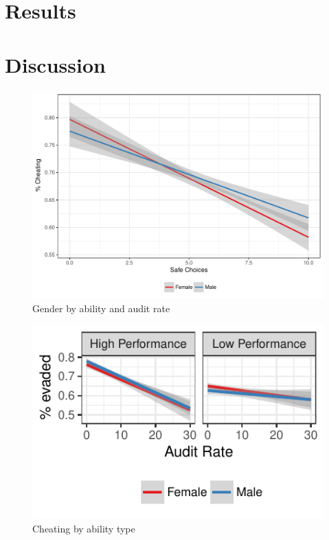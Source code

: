 \documentclass[9pt,twocolumn,twoside]{pnas-new}
\begin{document}
\section{Results}

\section{Discussion}


\begin{figure}[tbhp]
\centering
\includegraphics[width=.8\linewidth]{cheat_genderxsafechoices07Aug2017}
\caption{Gender by ability and audit rate}
\label{fig:frog}
\end{figure}


\begin{figure}[tbhp]
\centering
\includegraphics[width=.8\linewidth]{cheat_genderxability07Aug2017}
\caption{Cheating by ability type}\label{fig:side}
\end{figure}

\end{document}
